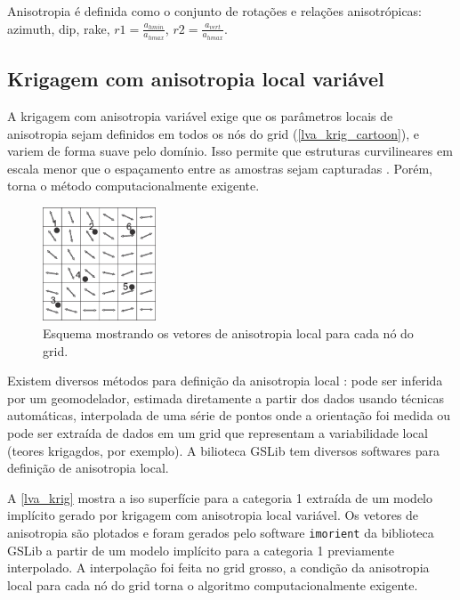 Anisotropia é definida como o conjunto de rotações e relações anisotrópicas: azimuth, dip, rake, $r1 = \frac{a_{hmin}}{a_{hmax}}$, $r2 = \frac{a_{vert}}{a_{hmax}}$. 

\subsection{Krigagem com anisotropia local variável}

A krigagem com anisotropia variável exige que os parâmetros locais de anisotropia sejam definidos em todos os nós do grid (\autoref{lva_krig_cartoon}), e variem de forma suave pelo domínio. Isso permite que estruturas curvilineares em escala menor que o espaçamento entre as amostras sejam capturadas \cite{martin2017implicitmodeling}. Porém, torna o método computacionalmente exigente.

\begin{figure}[H]
\caption{\label{lva_krig_cartoon}Esquema mostrando os vetores de anisotropia local para cada nó do grid.}
	\begin{center}
		\includegraphics[width=0.3\textwidth]{capitulo_2/lvakrig.jpg}
	\end{center}
\end{figure}

Existem diversos métodos para definição da anisotropia local \cite{lillah2015inference}: pode ser inferida por um geomodelador, estimada diretamente a partir dos dados usando técnicas automáticas, interpolada de uma série de pontos onde a orientação foi medida ou pode ser extraída de dados em um grid que representam a variabilidade local (teores krigagdos, por exemplo). A bilioteca GSLib tem diversos softwares para definição de anisotropia local. 

A \autoref{lva_krig} mostra a iso superfície para a categoria 1 extraída de um modelo implícito gerado por krigagem com anisotropia local variável. Os vetores de anisotropia são plotados e foram gerados pelo software \verb|imorient| da biblioteca GSLib a partir de um modelo implícito para a categoria 1 previamente interpolado. A interpolação foi feita no grid grosso, a condição da anisotropia local para cada nó do grid torna o algoritmo computacionalmente exigente.

